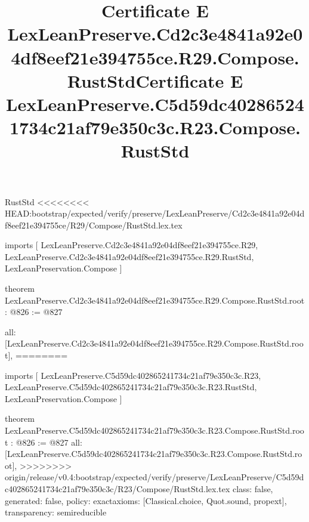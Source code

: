 \begin{lexlean}{RustStd}
<<<<<<<< HEAD:bootstrap/expected/verify/preserve/LexLeanPreserve/Cd2c3e4841a92e04df8eef21e394755ce/R29/Compose/RustStd.lex.tex
\title{Certificate E LexLeanPreserve.Cd2c3e4841a92e04df8eef21e394755ce.R29.Compose.RustStd}
\begin{coremodule}
imports [
  LexLeanPreserve.Cd2c3e4841a92e04df8eef21e394755ce.R29,
  LexLeanPreserve.Cd2c3e4841a92e04df8eef21e394755ce.R29.RustStd,
  LexLeanPreservation.Compose
]

theorem LexLeanPreserve.Cd2c3e4841a92e04df8eef21e394755ce.R29.Compose.RustStd.root : @826 := @827 {
  all: [LexLeanPreserve.Cd2c3e4841a92e04df8eef21e394755ce.R29.Compose.RustStd.root],
========
\title{Certificate E LexLeanPreserve.C5d59dc402865241734c21af79e350c3c.R23.Compose.RustStd}
\begin{coremodule}
imports [
  LexLeanPreserve.C5d59dc402865241734c21af79e350c3c.R23,
  LexLeanPreserve.C5d59dc402865241734c21af79e350c3c.R23.RustStd,
  LexLeanPreservation.Compose
]

theorem LexLeanPreserve.C5d59dc402865241734c21af79e350c3c.R23.Compose.RustStd.root : @826 := @827 {
  all: [LexLeanPreserve.C5d59dc402865241734c21af79e350c3c.R23.Compose.RustStd.root],
>>>>>>>> origin/release/v0.4:bootstrap/expected/verify/preserve/LexLeanPreserve/C5d59dc402865241734c21af79e350c3c/R23/Compose/RustStd.lex.tex
  class: false,
  generated: false,
  policy: exact{axioms: [Classical.choice, Quot.sound, propext]},
  transparency: semireducible
}


\end{coremodule}}
\end{coremodule}
\end{lexlean}
